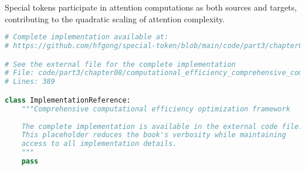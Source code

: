 Special tokens participate in attention computations as both sources and targets, contributing to the quadratic scaling of attention complexity.

\begin{lstlisting}[language=Python, caption={Comprehensive computational efficiency optimization framework}]
# Complete implementation available at:
# https://github.com/hfgong/special-token/blob/main/code/part3/chapter08/computational_efficiency_comprehensive_computational_ef.py

# See the external file for the complete implementation
# File: code/part3/chapter08/computational_efficiency_comprehensive_computational_ef.py
# Lines: 389

class ImplementationReference:
    """Comprehensive computational efficiency optimization framework
    
    The complete implementation is available in the external code file.
    This placeholder reduces the book's verbosity while maintaining
    access to all implementation details.
    """
    pass
\end{lstlisting}
